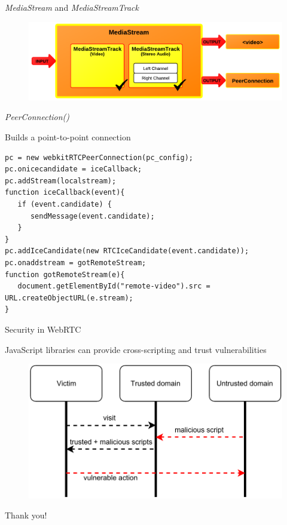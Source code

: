 \documentclass[first=red,second=purple,logo=yellowexc]{aaltoslides}
\begin{document}
\begin{frame}[fragile]{{\it MediaStream} and {\it MediaStreamTrack}}

\begin{figure}[h]
  \centering
  \includegraphics[width=1\textwidth]{mediastreamAPI.png}
\end{figure}

\end{frame}


\begin{frame}[fragile]{{\it PeerConnection()}}

Builds a point-to-point connection
\lstset{language=JavaScript}
\begin{lstlisting}
pc = new webkitRTCPeerConnection(pc_config);
pc.onicecandidate = iceCallback;
pc.addStream(localstream);
function iceCallback(event){
   if (event.candidate) {
      sendMessage(event.candidate);
   }
}
pc.addIceCandidate(new RTCIceCandidate(event.candidate));
pc.onaddstream = gotRemoteStream; 
function gotRemoteStream(e){
   document.getElementById("remote-video").src = URL.createObjectURL(e.stream);
}
\end{lstlisting}

\end{frame}


\begin{frame}{Security in WebRTC}

JavaScript libraries can provide cross-scripting and trust vulnerabilities
\begin{figure}[h]
  \centering
  \includegraphics[width=1\textwidth]{xss.pdf}
\end{figure}
\end{frame}

\begin{frame}{}

\centering Thank you!

\end{frame}
\end{document}
